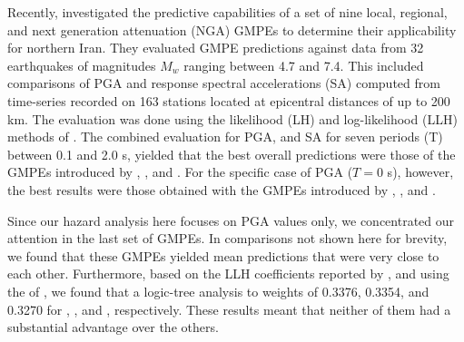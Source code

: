 Recently, \citet{Zafarani2014} investigated the predictive capabilities of a set of nine local, regional, and next generation attenuation (NGA) GMPEs to determine their applicability for northern Iran. They evaluated GMPE predictions against data from 32 earthquakes of magnitudes $M_w$ ranging between 4.7 and 7.4. This included comparisons of PGA and response spectral accelerations (SA) computed from time-series recorded on 163 stations located at epicentral distances of up to 200 km. The evaluation was done using the likelihood (LH) and log-likelihood (LLH) methods of \citet{Scherbaum_2004_BSSA, Scherbaum_2009_BSSA}. The combined evaluation for PGA, and SA for seven periods (T) between 0.1 and 2.0 s, yielded that the best overall predictions were those of the GMPEs introduced by \citet{Ghasemi_2009_JS}, \citet{Abrahamson_2008_ES}, and \citet{Chiou2008}. For the specific case of PGA ($T=0$ s), however, the best results were those obtained with the GMPEs introduced by \citet{Kalkan2004}, \citet{Chiou2008}, and \citet{Boore2008}. 

Since our hazard analysis here focuses on PGA values only, we concentrated our attention in the last set of GMPEs. In comparisons not shown here for brevity, we found that these GMPEs yielded mean predictions that were very close to each other. Furthermore, based on the LLH coefficients reported by \citet{Zafarani2014}, and using the  of \citet{Scherbaum_2009_BSSA}, we found that a logic-tree analysis  to weights of 0.3376, 0.3354, and 0.3270 for \citet{Kalkan2004}, \citet{Chiou2008}, and \citet{Boore2008}, respectively. These results meant that neither of them had a substantial advantage over the others. 

